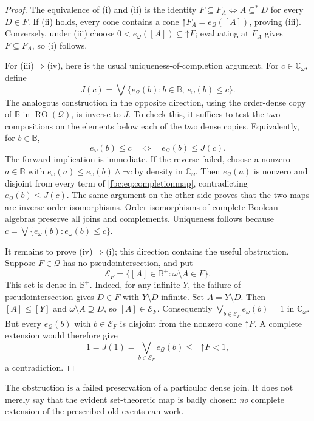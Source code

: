 \documentclass[11pt,letterpaper]{article}
\theoremstyle{definition}
\theoremstyle{remark}
\newcommand{\om}{\omega}
\newcommand{\B}{\mathbb B}
\newcommand{\C}{\mathbb C}
\newcommand{\up}{\mathord{\uparrow}}
\newcommand{\RO}{\operatorname{RO}}
\newcommand{\cE}{\mathcal E}
\newcommand{\cQ}{\mathcal Q}
\begin{document}
\begin{proof}
The equivalence of (i) and (ii) is the identity
$F\subseteq F_A\Longleftrightarrow A\subseteq^*D$ for every $D\in F$.
If (ii) holds, every cone contains a cone $\up F_A=e_\cQ([A])$,
proving (iii). Conversely, under (iii) choose
$0<e_\cQ([A])\subseteq\up F$; evaluating at $F_A$ gives $F\subseteq F_A$,
so (i) follows.

For (iii)$\Rightarrow$(iv), here is the usual uniqueness-of-completion
argument. For $c\in\C_\om$, define
\begin{equation}\label{fbc:eq:completionmap}
 J(c)=\bigvee\{e_\cQ(b):b\in\B,\,e_\om(b)\leq c\}.
\end{equation}
The analogous construction in the opposite direction, using the
order-dense copy of $\B$ in $\RO(\cQ)$, is inverse to $J$. To check this,
it suffices to test the two compositions on the elements below each
of the two dense copies. Equivalently, for $b\in\B$,
\[
 e_\om(b)\leq c\quad\Longleftrightarrow\quad e_\cQ(b)\leq J(c).
\]
The forward implication is immediate. If the reverse failed, choose a
nonzero $a\in\B$ with $e_\om(a)\leq e_\om(b)\wedge\neg c$ by density in
$\C_\om$. Then $e_\cQ(a)$ is nonzero and disjoint from every term of
\eqref{fbc:eq:completionmap}, contradicting $e_\cQ(b)\leq J(c)$.
The same argument on the other side proves that the two maps are inverse
order isomorphisms. Order isomorphisms of complete Boolean algebras
preserve all joins and complements. Uniqueness follows because
$c=\bigvee\{e_\om(b):e_\om(b)\leq c\}$.

It remains to prove (iv)$\Rightarrow$(i); this direction contains the
useful obstruction. Suppose $F\in\cQ$ has no pseudointersection, and put
\begin{equation}\label{fbc:eq:dense-incompatible}
 \cE_F=\{[A]\in\B^+:\om\setminus A\in F\}.
\end{equation}
This set is dense in $\B^+$. Indeed, for any infinite $Y$, the failure
of pseudointersection gives $D\in F$ with $Y\setminus D$ infinite.
Set $A=Y\setminus D$. Then $[A]\leq[Y]$ and $\om\setminus A\supseteq D$,
so $[A]\in\cE_F$. Consequently $\bigvee_{b\in\cE_F}e_\om(b)=1$ in $\C_\om$.
But every $e_\cQ(b)$ with $b\in\cE_F$ is disjoint from the nonzero cone
$\up F$. A complete extension would therefore give
\[
 1=J(1)=\bigvee_{b\in\cE_F}e_\cQ(b)\leq\neg\up F<1,
\]
a contradiction.
\end{proof}

The obstruction is a failed preservation of a particular dense join.
It does not merely say that the evident set-theoretic map is badly
chosen: \emph{no} complete extension of the prescribed old events can
work.
\end{document}

